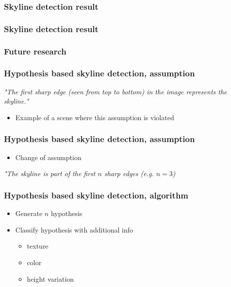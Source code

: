 \documentclass{beamer}
\begin{document}
\frame
{
	\frametitle{Skyline detection result}%
}

\frame
{
	\frametitle{Skyline detection result}%
}

\frame
{
	\frametitle{Future research}
}

\frame
{
	\frametitle{Hypothesis based skyline detection, assumption}
	\emph{"The first sharp edge (seen from top to bottom) in the image represents the skyline."}
	\begin{itemize}
	\item <+-| alert@+> Example of a scene where this assumption is violated
	\end{itemize}
}

\frame
{
	\frametitle{Hypothesis based skyline detection, assumption}
	\begin{itemize}
	\item <+-| alert@+> Change of assumption
	\end{itemize}
	\emph{"The skyline is part of the first $n$ sharp edges (e.g.  $n=3$)}
}

\frame
{
	\frametitle{Hypothesis based skyline detection, algorithm}
	\begin{itemize}
	\item <+-| alert@+> Generate $n$ hypothesis
	\item <+-| alert@+> Classify hypothesis with additional info
		\begin{itemize}
		\item <+-| alert@+> texture 
		\item <+-| alert@+> color
		\item <+-| alert@+> height variation 
		\end{itemize}
	\end{itemize}
}
\end{document}
